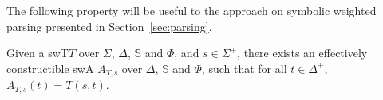 \documentclass[runningheads]{llncs}
\newcommand{\Semiring}{\mathbb{S}}
\def\SWT{\textsf{swT}\xspace}
\def\SWA{\textsf{swA}\xspace}
\begin{document}
      
      
      
\noindent
The following property will be useful to the approach on 
symbolic weighted parsing presented in Section~\ref{sec:parsing}.

\begin{proposition} \label{prop:epsilon}
Given a \SWT $T$ over $\Sigma$, $\Delta$, $\Semiring$ and $\bar\Phi$,
and $s \in \Sigma^+$, 
there exists an effectively constructible \SWA 
$A_{T, s}$ over $\Delta$, $\Semiring$ and $\bar\Phi$,
such that for all $t \in \Delta^+$, $A_{T, s}(t) = T(s, t)$.
\end{proposition}
%
\end{document}
